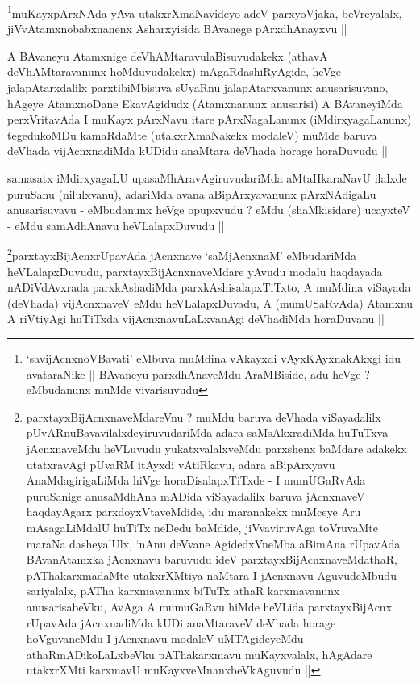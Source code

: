 \begin{artha}
\footnote{`savijAcnxnoVBavati' eMbuva muMdina vAkayxdi
  vAyxKAyxnakAkxgi idu avataraNike  || BAvaneyu parxdhAnaveMdu
  AraMBiside, adu heVge ? eMbudanunx muMde vivarisuvudu}muKayxpArxNAda yAva utakxrXmaNavideyo adeV parxyoVjaka, beVreyalalx,
jiVvAtamxnobabxnanenx Asharxyisida BAvanege pArxdhAnayxvu ||
\end{artha}


\begin{artha}
A BAvaneyu Atamxnige deVhAMtaravulaBisuvudakekx (athavA
deVhAMtaravanunx hoMduvudakekx) mAgaRdashiRyAgide, heVge
jalapAtarxdalilx parxtibiMbisuva sUyaRnu jalapAtarxvanunx
anusarisuvano, hAgeye AtamxnoDane EkavAgidudx (Atamxnanunx anusarisi)
A BAvaneyiMda perxVritavAda I muKayx pArxNavu itare pArxNagaLanunx
(iMdirxyagaLanunx) tegedukoMDu kamaRdaMte (utakxrXmaNakekx modaleV)
muMde baruva deVhada vijAcnxnadiMda kUDidu anaMtara deVhada horage
horaDuvudu ||
\end{artha}

\begin{artha}
samasatx iMdirxyagaLU upasaMhAravAgiruvudariMda aMtaHkaraNavU ilalxde
puruSanu (nilulxvanu), adariMda avana aBipArxyavanunx pArxNAdigaLu
anusarisuvavu - eMbudanunx heVge opupxvudu ? eMdu (shaMkisidare)
ucayxteV - eMdu samAdhAnavu heVLalapxDuvudu ||
\end{artha}


\begin{artha}
\footnote{parxtayxBijAcnxnaveMdareVnu ? muMdu baruva deVhada
  viSayadalilx pUvARnuBavavilalxdeyiruvudariMda adara saMsAkxradiMda
  huTuTxva jAcnxnaveMdu heVLuvudu yukatxvalalxveMdu parxshenx baMdare
  adakekx utatxravAgi pUvaRM itAyxdi vAtiRkavu, adara aBipArxyavu
  AnaMdagirigaLiMda hiVge horaDisalapxTiTxde - I mumUGaRvAda
  puruSanige anusaMdhAna mADida viSayadalilx baruva jAcnxnaveV
  haqdayAgarx parxdoyxVtaveMdide, idu maranakekx muMceye Aru
  mAsagaLiMdalU huTiTx neDedu baMdide, jiVvaviruvAga toVruvaMte maraNa
  dasheyalUlx, `nAnu deVvane AgidedxVneMba aBimAna rUpavAda
  BAvanAtamxka jAcnxnavu baruvudu ideV parxtayxBijAcnxnaveMdathaR,
  pAThakarxmadaMte utakxrXMtiya naMtara I jAcnxnavu AguvudeMbudu
  sariyalalx, pATha karxmavanunx biTuTx athaR karxmavanunx
  anusarisabeVku, AvAga A mumuGaRvu hiMde heVLida parxtayxBijAcnx
  rUpavAda jAcnxnadiMda kUDi anaMtaraveV deVhada horage hoVguvaneMdu I
  jAcnxnavu modaleV uMTAgideyeMdu athaRmADikoLaLxbeVku pAThakarxmavu
  muKayxvalalx, hAgAdare utakxrXMti karxmavU muKayxveMnanxbeVkAguvudu ||}parxtayxBijAcnxrUpavAda jAcnxnave `saMjAcnxnaM' eMbudariMda
heVLalapxDuvudu, parxtayxBijAcnxnaveMdare yAvudu modalu haqdayada
nADiVdAvxrada parxkAshadiMda parxkAshisalapxTiTxto, A muMdina viSayada
(deVhada) vijAcnxnaveV eMdu heVLalapxDuvadu, A (mumUSaRvAda) Atamxnu A
riVtiyAgi huTiTxda vijAcnxnavuLaLxvanAgi deVhadiMda horaDuvanu ||
\end{artha}


